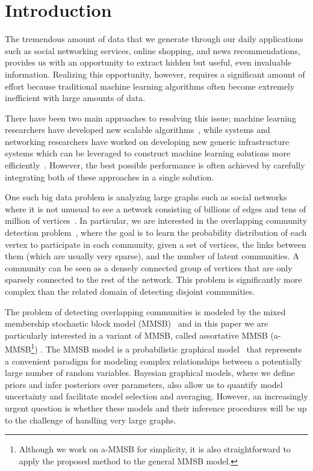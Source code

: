 \section{Introduction}
The tremendous amount of data that we generate through our daily applications such as social networking services, online shopping, and news recommendations, provides us with an opportunity to extract hidden but useful, even invaluable information. Realizing this opportunity, however, requires a significant amount of effort because traditional machine learning algorithms often become extremely inefficient with large amounts of data.

There have been two main approaches to resolving this issue; machine learning researchers have developed new scalable algorithms~\cite{bottou2010large, boyd2011distributed}, while systems and networking researchers have worked on developing new generic infrastructure systems which can be leveraged to construct machine learning solutions more efficiently~\cite{dean2008mapreduce, chang2008bigtable}.
However, the best possible performance is often achieved by carefully integrating both of these approaches in a single solution.

One such big data problem is analyzing large graphs such as social networks where it is not unusual to see a network consisting of billions of edges and tens of million of vertices~\cite{yang2015defining}. In particular, we are interested in the overlapping community detection problem~\cite{xie2013overlapping}, where the goal is to learn the probability distribution of each vertex to participate in each community, given a set of vertices, the links between them (which are usually very sparse), and the number of latent communities. A community can be seen as a densely connected group of vertices that are only sparsely connected to the rest of the network. This problem is significantly more complex than the related domain of detecting disjoint communities.

The problem of detecting overlapping communities is modeled by the mixed membership stochastic block model (MMSB)~\cite{airoldi2009mixed} and in this paper we are particularly interested in a variant of MMSB, called assortative MMSB (a-MMSB\footnote{Although we work on a-MMSB for simplicity, it is also straightforward to apply the proposed method to the general MMSB model.}) \cite{gopalan2012scalable}.
The MMSB model is a probabilistic graphical model~\cite{koller2009probabilistic} that represents a convenient paradigm for modeling complex relationships between a potentially large number of random variables. Bayesian graphical models, where we define priors and infer posteriors over parameters, also allow us to quantify model uncertainty and facilitate model selection and averaging. However, an increasingly urgent question is whether these models and their inference procedures will be up to the challenge of handling very large graphs.

